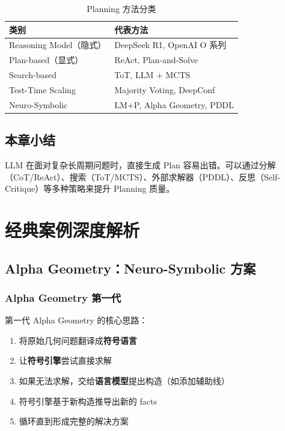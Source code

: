 \documentclass[a4paper]{article}
\begin{document}
\begin{table}[H]
\centering
\begin{tabular}{ll}
\toprule
\textbf{类别} & \textbf{代表方法} \\
\midrule
Reasoning Model（隐式） & DeepSeek R1, OpenAI O 系列 \\
Plan-based（显式） & ReAct, Plan-and-Solve \\
Search-based & ToT, LLM + MCTS \\
Test-Time Scaling & Majority Voting, DeepConf \\
Neuro-Symbolic & LM+P, Alpha Geometry, PDDL \\
\bottomrule
\end{tabular}
\caption{Planning 方法分类}
\end{table}

\subsection{本章小结}

LLM 在面对复杂长周期问题时，直接生成 Plan 容易出错。可以通过分解（CoT/ReAct）、搜索（ToT/MCTS）、外部求解器（PDDL）、反思（Self-Critique）等多种策略来提升 Planning 质量。


\section{经典案例深度解析}

\subsection{Alpha Geometry：Neuro-Symbolic 方案}

\subsubsection{Alpha Geometry 第一代}

第一代 Alpha Geometry 的核心思路：
\begin{enumerate}
    \item 将原始几何问题翻译成\textbf{符号语言}
    \item 让\textbf{符号引擎}尝试直接求解
    \item 如果无法求解，交给\textbf{语言模型}提出构造（如添加辅助线）
    \item 符号引擎基于新构造推导出新的 facts
    \item 循环直到形成完整的解决方案
\end{enumerate}
\end{document}
